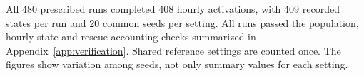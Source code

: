 All 480 prescribed runs completed 408 hourly activations, with 409 recorded states per run and 20 common seeds per setting. All runs passed the population, hourly-state and rescue-accounting checks summarized in Appendix~\ref{app:verification}. Shared reference settings are counted once. The figures show variation among seeds, not only summary values for each setting.
